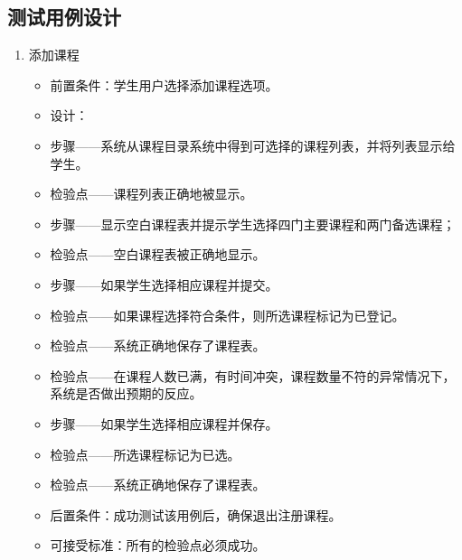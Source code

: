 \subsection{测试用例设计}
\begin{enumerate}
  \item 添加课程
  \begin{itemize}
    \item 前置条件：学生用户选择添加课程选项。
    \item 设计：
    \item 步骤——系统从课程目录系统中得到可选择的课程列表，并将列表显示给学生。
    \item 检验点——课程列表正确地被显示。
    \item 步骤——显示空白课程表并提示学生选择四门主要课程和两门备选课程；
    \item 检验点——空白课程表被正确地显示。
    \item 步骤——如果学生选择相应课程并提交。
    \item 检验点——如果课程选择符合条件，则所选课程标记为已登记。
    \item 检验点——系统正确地保存了课程表。
    \item 检验点——在课程人数已满，有时间冲突，课程数量不符的异常情况下，系统是否做出预期的反应。
    \item 步骤——如果学生选择相应课程并保存。
    \item 检验点——所选课程标记为已选。
    \item 检验点——系统正确地保存了课程表。
    \item 后置条件：成功测试该用例后，确保退出注册课程。
    \item 可接受标准：所有的检验点必须成功。
  \end{itemize}
\end{enumerate}
